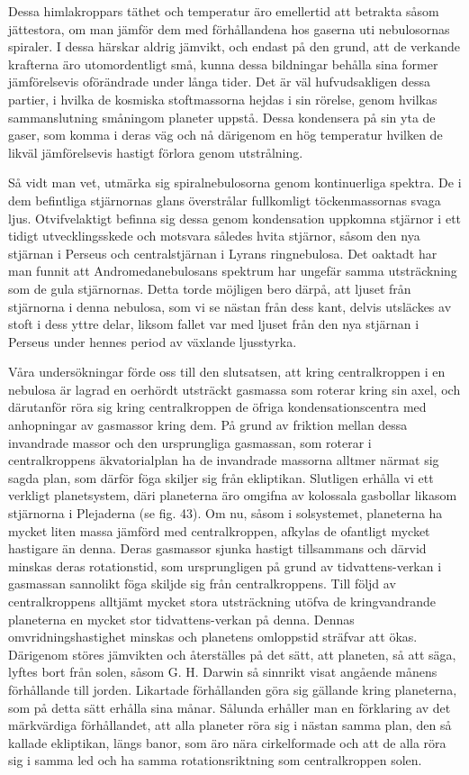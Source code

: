 \documentclass[a4paper, 12pt, oneside, swedish]{article}
\begin{document}
Dessa himlakroppars täthet och temperatur äro emellertid att betrakta såsom jättestora, om man jämför dem med förhållandena hos gaserna uti nebulosornas spiraler. I dessa härskar aldrig jämvikt, och endast på den grund, att de verkande krafterna äro utomordentligt små, kunna dessa bildningar behålla sina former jämförelsevis oförändrade under långa tider. Det är väl hufvudsakligen dessa partier, i hvilka de kosmiska stoftmassorna hejdas i sin rörelse, genom hvilkas sammanslutning småningom planeter uppstå. Dessa kondensera på sin yta de gaser, som komma i deras väg och nå därigenom en hög temperatur hvilken de likväl jämförelsevis hastigt förlora genom utstrålning.

Så vidt man vet, utmärka sig spiralnebulosorna genom kontinuerliga spektra. De i dem befintliga stjärnornas glans överstrålar fullkomligt töckenmassornas svaga ljus. Otvifvelaktigt befinna sig dessa genom kondensation uppkomna stjärnor i ett tidigt utvecklingsskede och motsvara således hvita stjärnor, såsom den nya stjärnan i Perseus och centralstjärnan i Lyrans ringnebulosa. Det oaktadt har man funnit att Andromedanebulosans spektrum har ungefär samma utsträckning som de gula stjärnornas. Detta torde möjligen bero därpå, att ljuset från stjärnorna i denna nebulosa, som vi se nästan från dess kant, delvis utsläckes av stoft i dess yttre delar, liksom fallet var med ljuset från den nya stjärnan i Perseus under hennes period av växlande ljusstyrka.

Våra undersökningar förde oss till den slutsatsen, att kring centralkroppen i en nebulosa är lagrad en oerhördt utsträckt gasmassa som roterar kring sin axel, och därutanför röra sig kring centralkroppen de öfriga kondensationscentra med anhopningar av gasmassor kring dem. På grund av friktion mellan dessa invandrade massor och den ursprungliga gasmassan, som roterar i centralkroppens äkvatorialplan ha de invandrade massorna alltmer närmat sig sagda plan, som därför föga skiljer sig från ekliptikan. Slutligen erhålla vi ett verkligt planetsystem, däri planeterna äro omgifna av kolossala gasbollar likasom stjärnorna i Plejaderna (se fig. 43). Om nu, såsom i solsystemet, planeterna ha mycket liten massa jämförd med centralkroppen, afkylas de ofantligt mycket hastigare än denna. Deras gasmassor sjunka hastigt tillsammans och därvid minskas deras rotationstid, som ursprungligen på grund av tidvattens-verkan i gasmassan sannolikt föga skiljde sig från centralkroppens. Till följd av centralkroppens alltjämt mycket stora utsträckning utöfva de kringvandrande planeterna en mycket stor tidvattens-verkan på denna. Dennas omvridningshastighet minskas och planetens omloppstid sträfvar att ökas. Därigenom störes jämvikten och återställes på det sätt, att planeten, så att säga, lyftes bort från solen, såsom G. H. Darwin så sinnrikt visat angående månens förhållande till jorden. Likartade förhållanden göra sig gällande kring planeterna, som på detta sätt erhålla sina månar. Sålunda erhåller man en förklaring av det märkvärdiga förhållandet, att alla planeter röra sig i nästan samma plan, den så kallade ekliptikan, längs banor, som äro nära cirkelformade och att de alla röra sig i samma led och ha samma rotationsriktning som centralkroppen solen.
\end{document}
